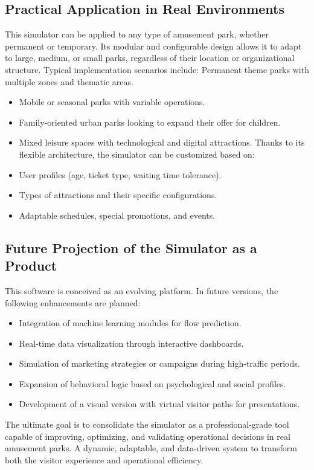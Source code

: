 \documentclass[12pt]{article}
\begin{document}
\subsection{Practical Application in Real Environments}
This simulator can be applied to any type of amusement park, whether permanent or temporary. Its modular and configurable design allows it to adapt to large, medium, or small parks, regardless of their location or organizational structure. Typical implementation scenarios include:
Permanent theme parks with multiple zones and thematic areas.
\begin{itemize}
\item  Mobile or seasonal parks with variable operations.
\item  Family-oriented urban parks looking to expand their offer for children.
\item  Mixed leisure spaces with technological and digital attractions.
Thanks to its flexible architecture, the simulator can be customized based on:
\item  User profiles (age, ticket type, waiting time tolerance).
\item  Types of attractions and their specific configurations.
\item  Adaptable schedules, special promotions, and events.
\end{itemize}

\subsection{Future Projection of the Simulator as a Product}
This software is conceived as an evolving platform. In future versions, the following enhancements are planned:

\begin{itemize}
\item  Integration of machine learning modules for flow prediction.
\item  Real-time data visualization through interactive dashboards.
\item  Simulation of marketing strategies or campaigns during high-traffic periods.
\item  Expansion of behavioral logic based on psychological and social profiles.
\item  Development of a visual version with virtual visitor paths for presentations.
\end{itemize}

The ultimate goal is to consolidate the simulator as a professional-grade tool capable of improving, optimizing, and validating operational decisions in real amusement parks. A dynamic, adaptable, and data-driven system to transform both the visitor experience and operational efficiency.
\end{document}
